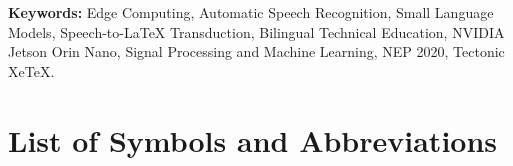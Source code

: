 \documentclass[11pt,a4paper,oneside]{report}
\begin{document}
\vspace{1.0em}
\textbf{Keywords:} Edge Computing, Automatic Speech Recognition, Small Language Models, Speech-to-LaTeX Transduction, Bilingual Technical Education, NVIDIA Jetson Orin Nano, Signal Processing and Machine Learning, NEP 2020, Tectonic XeTeX.

\clearpage

\tableofcontents
\clearpage

\listoffigures
\clearpage

\listoftables
\clearpage

\chapter*{List of Symbols and Abbreviations}
\end{document}
